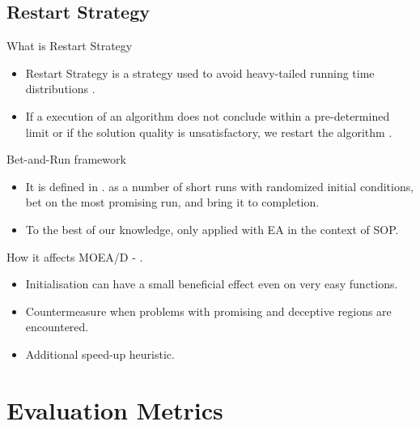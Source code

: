 \documentclass[ignorenonframetext,]{beamer}
\begin{document}
\subsection{Restart Strategy}\label{restart-strategy}

\begin{frame}{What is Restart Strategy}

\begin{itemize}
\item
  Restart Strategy is a strategy used to avoid heavy-tailed running time
  distributions \citet{gomes2000heavy}.
\item
  If a execution of an algorithm does not conclude within a
  pre-determined limit or if the solution quality is unsatisfactory, we
  restart the algorithm \citet{lissovoi2017theoretical}.
\end{itemize}

\end{frame}

\begin{frame}{Bet-and-Run framework}

\begin{itemize}
\item
  It is defined in \citet{fischetti2014exploiting}. as a number of short
  runs with randomized initial conditions, bet on the most promising
  run, and bring it to completion.
\item
  To the best of our knowledge, only applied with EA in the context of
  SOP.
\end{itemize}

\end{frame}

\begin{frame}{How it affects MOEA/D - \citet{lissovoi2017theoretical}.}

\begin{itemize}
\item
  Initialisation can have a small beneficial effect even on very easy
  functions.
\item
  Countermeasure when problems with promising and deceptive regions are
  encountered.
\item
  Additional speed-up heuristic.
\end{itemize}

\end{frame}

\section{Evaluation Metrics}\label{evaluation-metrics}
\end{document}

